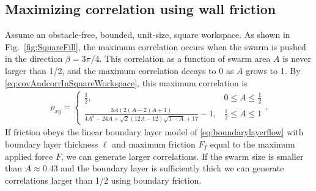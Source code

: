 \subsection{Maximizing correlation using wall friction}\label{subsec:ClosedLoopCovarianceControl}

Assume an obstacle-free, bounded, unit-size, square workspace. 
 As shown in Fig.~\ref{fig:SquareFill}, the maximum correlation occurs when the swarm is pushed in the direction $\beta = 3\pi/4$. 
 This correlation as a function of swarm area $A$ is never larger than 1/2, and the maximum correlation decays to 0 as $A$ grows to 1. By  \eqref{eq:covAndcorrInSquareWorkspace}, this maximum correlation is
\begin{align} \label{eq:GravityCorrelation}
\rho_{xy} =  \begin{cases}  \frac{1}{2}  , &  0\le A\le \frac{1}{2}  \\
 \frac{3 A (2 (A-2) A+1)}{4 A^3-24 A+\sqrt{2} (12 A-12) \sqrt{1-A}+17}-1
 , & \frac{1}{2} \le A\le 1
\end{cases}.
\end{align}
 If friction obeys the linear boundary layer model of \eqref{eq:boundarylayerflow} with boundary layer thickness $\ell$ and maximum friction $F_f$ equal to the maximum applied force $F$, we can generate  larger correlations.
 If the swarm size is smaller than $A \approx 0.43$ and the boundary layer is sufficiently thick we can generate correlations larger than 1/2  using boundary friction.

